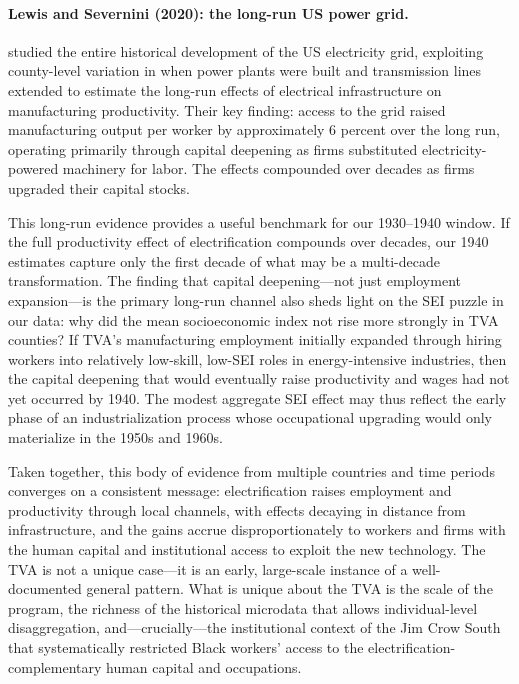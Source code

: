 \documentclass[12pt]{article}
\begin{document}
\paragraph{Lewis and Severnini (2020): the long-run US power grid.} \citet{lewis2020} studied the entire historical development of the US electricity grid, exploiting county-level variation in when power plants were built and transmission lines extended to estimate the long-run effects of electrical infrastructure on manufacturing productivity. Their key finding: access to the grid raised manufacturing output per worker by approximately 6 percent over the long run, operating primarily through capital deepening as firms substituted electricity-powered machinery for labor. The effects compounded over decades as firms upgraded their capital stocks.

This long-run evidence provides a useful benchmark for our 1930--1940 window. If the full productivity effect of electrification compounds over decades, our 1940 estimates capture only the first decade of what may be a multi-decade transformation. The \citeauthor{lewis2020} finding that capital deepening---not just employment expansion---is the primary long-run channel also sheds light on the SEI puzzle in our data: why did the mean socioeconomic index not rise more strongly in TVA counties? If TVA's manufacturing employment initially expanded through hiring workers into relatively low-skill, low-SEI roles in energy-intensive industries, then the capital deepening that would eventually raise productivity and wages had not yet occurred by 1940. The modest aggregate SEI effect may thus reflect the early phase of an industrialization process whose occupational upgrading would only materialize in the 1950s and 1960s.

Taken together, this body of evidence from multiple countries and time periods converges on a consistent message: electrification raises employment and productivity through local channels, with effects decaying in distance from infrastructure, and the gains accrue disproportionately to workers and firms with the human capital and institutional access to exploit the new technology. The TVA is not a unique case---it is an early, large-scale instance of a well-documented general pattern. What is unique about the TVA is the scale of the program, the richness of the historical microdata that allows individual-level disaggregation, and---crucially---the institutional context of the Jim Crow South that systematically restricted Black workers' access to the electrification-complementary human capital and occupations.
\end{document}
